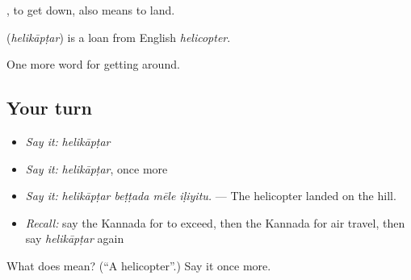 , to get down, also means to land.

\begin{cousinweb}
\textbf{} (\emph{helikāpṭar}) is a loan from English \emph{helicopter}.
\end{cousinweb}

\begin{grammarlens}[title={What you've built}]
One more word for getting around.
\end{grammarlens}

\subsection*{Your turn}
\begin{itemize}
\raggedright
  \item \emph{Say it:} \emph{helikāpṭar}
  \item \emph{Say it:} \emph{helikāpṭar}, once more
  \item \emph{Say it:} \emph{helikāpṭar beṭṭada mēle iḷiyitu.} — The helicopter landed on the hill.
  \item \emph{Recall:} say the Kannada for to exceed, then the Kannada for air travel, then say \emph{helikāpṭar} again
\end{itemize}

\begin{tcolorbox}[breakable,colback=teal!4,colframe=teal!35!black,title={Before you move on}]
What does  mean? (\textquotedblleft{}A helicopter\textquotedblright{}.) Say it once more.
\end{tcolorbox}
